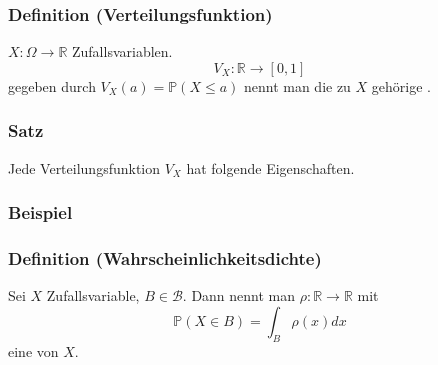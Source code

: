 \subsubsection{Definition (Verteilungsfunktion)}
$X\colon\Omega\to\mathbb{R}$ Zufallsvariablen.
\[V_X\colon\mathbb{R}\to[0,1]\]
gegeben durch $V_X(a)=\mathbb{P}(X\leq a)$ nennt man die zu $X$ geh\"orige .
\subsubsection{Satz}
Jede Verteilungsfunktion $V_X$ hat folgende Eigenschaften.
\subsubsection{Beispiel}
\subsubsection{Definition (Wahrscheinlichkeitsdichte)}
Sei $X$ Zufallsvariable, $B\in\mathcal{B}$. Dann nennt man $\rho\colon\mathbb{R}\to\mathbb{R}$ mit
\[
    \mathbb{P}(X\in B)=\int_{B}\rho(x)dx
\]
eine  von $X$.
